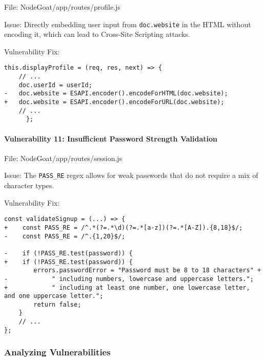   File: NodeGoat/app/routes/profile.js
  
  Issue: Directly embedding user input from \texttt{doc.website} in the
  HTML without encoding it, which can lead to Cross-Site Scripting
  attacks.
  
  Vulnerability Fix:
  
  \begin{framed}\scriptsize
    \begin{verbatim}
this.displayProfile = (req, res, next) => {
    // ...
    doc.userId = userId;
-   doc.website = ESAPI.encoder().encodeForHTML(doc.website);
+   doc.website = ESAPI.encoder().encodeForURL(doc.website);
    // ...
      };
      \end{verbatim}
  \end{framed}\normalsize
  
  \hypertarget{vulnerability-11-insufficient-password-strength-validation}{%
  \paragraph{Vulnerability 11: Insufficient Password Strength
  Validation}\label{vulnerability-11-insufficient-password-strength-validation}}
  
  File: NodeGoat/app/routes/session.js
  
  Issue: The \texttt{PASS\_RE} regex allows for weak passwords that do not
  require a mix of character types.
  
  Vulnerability Fix:
  
  \begin{framed}\scriptsize
    \begin{verbatim}
const validateSignup = (...) => {
+    const PASS_RE = /^.*(?=.*\d)(?=.*[a-z])(?=.*[A-Z]).{8,18}$/;
-    const PASS_RE = /^.{1,20}$/;

-    if (!PASS_RE.test(password)) {
+    if (!PASS_RE.test(password)) {
        errors.passwordError = "Password must be 8 to 18 characters" +
-            " including numbers, lowercase and uppercase letters.";
+            " including at least one number, one lowercase letter, and one uppercase letter.";
        return false;
    }
    // ...
};
     \end{verbatim}
     
  \end{framed}\normalsize
  
  \hypertarget{analyzing-vulnerabilities}{%
  \subsubsection{Analyzing
  Vulnerabilities}\label{analyzing-vulnerabilities}}
  
